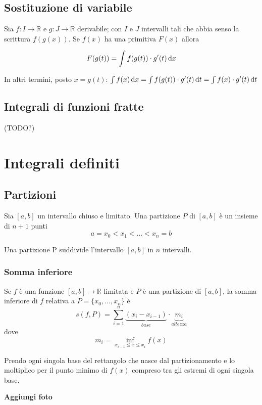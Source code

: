 \section{Sostituzione di variabile}

Sia $f: I \to \mathbb{R}$ e $g: J \to \mathbb{R}$ derivabile; con $I$ e $J$ intervalli tali che abbia senso la scrittura $f(g(x))$. Se $f(x)$ ha una primitiva $F(x)$ allora

$$F(g(t)) = \int f(g(t)) \cdot g'(t) \mathop{}\!\mathrm{d} x$$

\begin{tip}
In altri termini, posto $x = g(t)$:
$\int f(x) \mathop{}\!\mathrm{d} x = \int f(g(t)) \cdot g'(t) \mathop{}\!\mathrm{d} t \\
= \int f(x) \cdot g'(t) \mathop{}\!\mathrm{d} t$
\end{tip}


\section{Integrali di funzioni fratte}

(TODO?)

\chapter{Integrali definiti}

\section{Partizioni}

Sia $[a,b]$ un intervallo chiuso e limitato. Una partizione $P$ di $[a,b]$ è un insieme di $n+1$ punti $$a=x_0<x_1<\ldots <x_n=b$$

\begin{tip}
Una partizione P suddivide l'intervallo $[a,b]$ in $n$ intervalli.
\end{tip}
    
\subsection{Somma inferiore}

Se $f$ è una funzione $[a,b] \to \mathbb{R}$ limitata e $P$ è una partizione di $[a,b]$, la somma inferiore di $f$ relativa a $P = \{x_0, \ldots, x_n\}$ è $$ s(f,P) = \sum_{i=1}^n \underbrace{(x_i-x_{i-1})}_{base} \cdot \underbrace{m_i}_{altezza} $$ dove $$ m_i = \inf_{x_{i-1} \le x \le x_i} f(x) $$

\begin{tip}
Prendo ogni singola base del rettangolo che nasce dal partizionamento e lo moltiplico per il punto minimo di $f(x)$ compreso tra gli estremi di ogni singola base.

\textbf{Aggiungi foto}
\end{tip}

